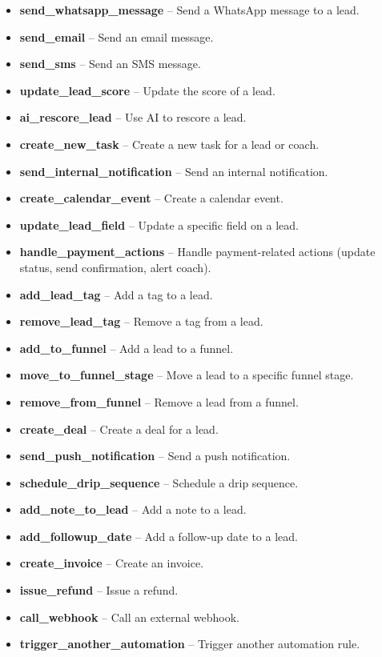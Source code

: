 \documentclass[12pt,a4paper]{article}
\begin{document}
\begin{itemize}[leftmargin=2em]
    \item \textbf{send\_whatsapp\_message} -- Send a WhatsApp message to a lead.
    \item \textbf{send\_email} -- Send an email message.
    \item \textbf{send\_sms} -- Send an SMS message.
    \item \textbf{update\_lead\_score} -- Update the score of a lead.
    \item \textbf{ai\_rescore\_lead} -- Use AI to rescore a lead.
    \item \textbf{create\_new\_task} -- Create a new task for a lead or coach.
    \item \textbf{send\_internal\_notification} -- Send an internal notification.
    \item \textbf{create\_calendar\_event} -- Create a calendar event.
    \item \textbf{update\_lead\_field} -- Update a specific field on a lead.
    \item \textbf{handle\_payment\_actions} -- Handle payment-related actions (update status, send confirmation, alert coach).
    \item \textbf{add\_lead\_tag} -- Add a tag to a lead.
    \item \textbf{remove\_lead\_tag} -- Remove a tag from a lead.
    \item \textbf{add\_to\_funnel} -- Add a lead to a funnel.
    \item \textbf{move\_to\_funnel\_stage} -- Move a lead to a specific funnel stage.
    \item \textbf{remove\_from\_funnel} -- Remove a lead from a funnel.
    \item \textbf{create\_deal} -- Create a deal for a lead.
    \item \textbf{send\_push\_notification} -- Send a push notification.
    \item \textbf{schedule\_drip\_sequence} -- Schedule a drip sequence.
    \item \textbf{add\_note\_to\_lead} -- Add a note to a lead.
    \item \textbf{add\_followup\_date} -- Add a follow-up date to a lead.
    \item \textbf{create\_invoice} -- Create an invoice.
    \item \textbf{issue\_refund} -- Issue a refund.
    \item \textbf{call\_webhook} -- Call an external webhook.
    \item \textbf{trigger\_another\_automation} -- Trigger another automation rule.
\end{itemize}
\end{document}
